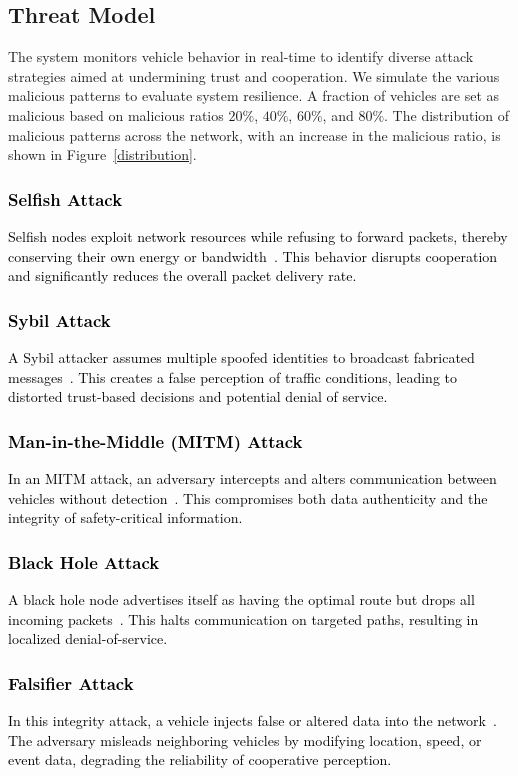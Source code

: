 \cite{cho2010survey}\documentclass[journal,comsoc,twoside]{IEEEtran}
\begin{document}
\subsection{Threat Model}
The system monitors vehicle behavior in real-time to identify diverse attack strategies aimed at undermining trust and cooperation. We simulate the various malicious patterns to evaluate system resilience. A fraction of vehicles are set as malicious based on malicious ratios $20\%$, $40\%$, $60\%$, and $80\%$. The distribution of malicious patterns across the network, with an increase in the malicious ratio, is shown in Figure~\ref{distribution}.

\textcolor{black}{
\subsubsection{Selfish Attack}
Selfish nodes exploit network resources while refusing to forward packets, thereby conserving their own energy or bandwidth~\cite{fayaz}. This behavior disrupts cooperation and significantly reduces the overall packet delivery rate.}
\textcolor{black}{
\subsubsection{Sybil Attack}
A Sybil attacker assumes multiple spoofed identities to broadcast fabricated messages~\cite{alalwany}. This creates a false perception of traffic conditions, leading to distorted trust-based decisions and potential denial of service.}
\textcolor{black}{
\subsubsection{Man-in-the-Middle (MITM) Attack}
In an MITM attack, an adversary intercepts and alters communication between vehicles without detection~\cite{alalwany}. This compromises both data authenticity and the integrity of safety-critical information.}
\textcolor{black}{
\subsubsection{Black Hole Attack}
A black hole node advertises itself as having the optimal route but drops all incoming packets~\cite{alalwany}. This halts communication on targeted paths, resulting in localized denial-of-service.}
\textcolor{black}{
\subsubsection{Falsifier Attack} 
In this integrity attack, a vehicle injects false or altered data into the network~\cite{aslan}. The adversary misleads neighboring vehicles by modifying location, speed, or event data, degrading the reliability of cooperative perception.}
\end{document}
